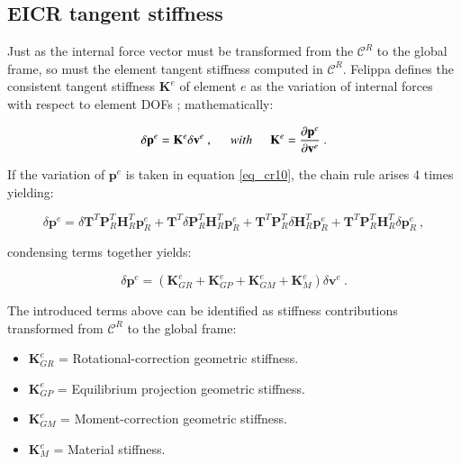  \subsection{EICR tangent stiffness}
 Just as the internal force vector must be transformed from the $\mathscr{C}^R$ to the global frame, so must the element tangent stiffness computed in $\mathscr{C}^R$. Felippa defines the consistent tangent stiffness $\mathbf{K}^e$ of element $e$ as the variation of internal forces with respect to element DOFs \cite{felippa2005unified}; mathematically:
 
 \begin{equation} 
\delta \mathbf{p}^e
 =
\mathbf{K}^e \delta \mathbf{v}^e\ ,
\hspace{5mm}
with
\hspace{5mm}
\mathbf{K}^e = 
\frac{\partial \mathbf{p}^e}{\partial \mathbf{v}^e}
 \label{eq_cr11}\ .
 \end{equation}
 
 If the variation of $\mathbf{p}^e$ is taken in equation \ref{eq_cr10}, the chain rule arises 4 times yielding:
 
  \begin{equation} 
 \delta \mathbf{p}^e
 =
\delta \mathbf{T}^T \mathbf{P}_R^T \mathbf{H}_R^T \mathbf{p}_R^e
+
\mathbf{T}^T \delta \mathbf{P}_R^T \mathbf{H}_R^T \mathbf{p}_R^e
+
\mathbf{T}^T \mathbf{P}_R^T \delta \mathbf{H}_R^T \mathbf{p}_R^e
+
\mathbf{T}^T\mathbf{P}_R^T \mathbf{H}_R^T  \delta \mathbf{p}_R^e
 \label{eq_cr12}\ ,
 \end{equation}
 
 condensing terms together yields:
 
   \begin{equation} 
 \delta \mathbf{p}^e
 =
(\mathbf{K}_{GR}^e + 
\mathbf{K}_{GP}^e + 
\mathbf{K}_{GM}^e + 
\mathbf{K}_{M}^e
)
\delta \mathbf{v}^e
 \label{eq_cr13}\ .
 \end{equation}
 
 The introduced terms above can be identified as stiffness contributions transformed from $\mathscr{C}^R$ to the global frame:
 
 \begin{itemize}
 	\item $\mathbf{K}_{GR}^e$ = Rotational-correction geometric stiffness.
 	\item $\mathbf{K}_{GP}^e$ = Equilibrium projection geometric stiffness.
 	\item $\mathbf{K}_{GM}^e$ = Moment-correction geometric stiffness.
 	\item $\mathbf{K}_{M}^e$ = Material stiffness.
 \end{itemize}
 

